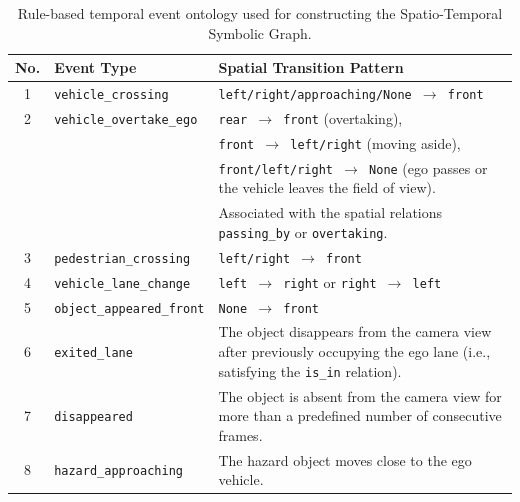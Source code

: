 \documentclass[a4paper, 11pt]{article} %
\begin{document}
\begin{table}[H]
\centering
\renewcommand{\arraystretch}{1.2}

\begin{tabular}{|c|p{4.2cm}|p{9.5cm}|}
\hline
\textbf{No.} &
\textbf{Event Type} &
\textbf{Spatial Transition Pattern} \\
\hline

1 &
\texttt{vehicle\_crossing} &
\texttt{left/right/approaching/None $\rightarrow$ front} \\
\hline

2 &
\texttt{vehicle\_overtake\_ego} &
\texttt{rear $\rightarrow$ front} (overtaking),\\
&
&
\texttt{front $\rightarrow$ left/right} (moving aside),\\
&
&
\texttt{front/left/right $\rightarrow$ None} (ego passes or the vehicle leaves the field of view).\\
&
&
Associated with the spatial relations \texttt{passing\_by} or \texttt{overtaking}. \\
\hline

3 &
\texttt{pedestrian\_crossing} &
\texttt{left/right $\rightarrow$ front} \\
\hline

4 &
\texttt{vehicle\_lane\_change} &
\texttt{left $\rightarrow$ right} or
\texttt{right $\rightarrow$ left} \\
\hline

5 &
\texttt{object\_appeared\_front} &
\texttt{None $\rightarrow$ front} \\
\hline

6 &
\texttt{exited\_lane} &
The object disappears from the camera view after previously occupying the ego lane (i.e., satisfying the \texttt{is\_in} relation). \\
\hline

7 &
\texttt{disappeared} &
The object is absent from the camera view for more than a predefined number of consecutive frames. \\
\hline
8 &
\texttt{hazard\_approaching} &
The hazard object moves close to the ego vehicle. \\
\hline


\end{tabular}

\caption{Rule-based temporal event ontology used for constructing the Spatio-Temporal Symbolic Graph.}
\label{tab:event_ontology}

\end{table}
\end{document}
